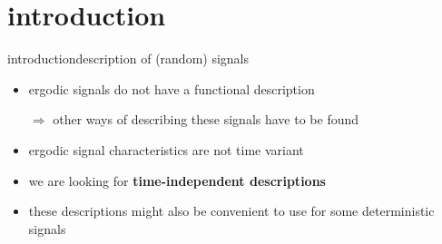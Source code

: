 



\subtitle{Part 4: Signal Description}


	

\section{introduction}
\begin{frame}{introduction}{description of (random) signals}
    \begin{itemize}
        \item   ergodic signals do not have a functional description
        \item[$\Rightarrow$]    other ways of describing these signals have to be found
        \bigskip
        \item<2->   ergodic signal characteristics are not time variant
        \item<2->[$\Rightarrow$]    we are looking for \textbf{time-independent descriptions}
        \bigskip
        \item<3-> these descriptions might also be convenient to use for some deterministic signals
    \end{itemize}
\end{frame}

